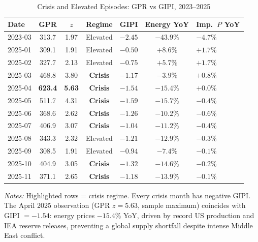 \documentclass[12pt]{article}
\begin{document}
\begin{table}[htbp]\begin{center}
\caption{Crisis and Elevated Episodes: GPR vs GIPI, 2023--2025}
\label{tab:decouple}
\begin{threeparttable}\small
\begin{tabular}{lcccccl}
\toprule
Date & GPR & $z$ & Regime & GIPI & Energy YoY & Imp.\ $P$ YoY\\
\midrule
2023-03 & 313.7 & 1.97 & Elevated & $-2.45$ & $-43.9\%$ & $-4.7\%$\\
2025-01 & 309.1 & 1.91 & Elevated & $-0.50$ & $+8.6\%$ & $+1.7\%$\\
2025-02 & 327.7 & 2.13 & Elevated & $-0.75$ & $+5.7\%$ & $+1.7\%$\\
\rowcolor{yellow!15}
2025-03 & 468.8 & 3.80 & \textbf{Crisis} & $-1.17$ & $-3.9\%$ & $+0.8\%$\\
\rowcolor{yellow!15}
2025-04 & \textbf{623.4} & \textbf{5.63} & \textbf{Crisis} & $-1.54$ & $-15.4\%$ & $+0.0\%$\\
\rowcolor{yellow!15}
2025-05 & 511.7 & 4.31 & \textbf{Crisis} & $-1.59$ & $-15.7\%$ & $-0.4\%$\\
\rowcolor{yellow!15}
2025-06 & 368.6 & 2.62 & \textbf{Crisis} & $-1.26$ & $-10.2\%$ & $-0.6\%$\\
\rowcolor{yellow!15}
2025-07 & 406.9 & 3.07 & \textbf{Crisis} & $-1.04$ & $-11.2\%$ & $-0.4\%$\\
2025-08 & 343.3 & 2.32 & Elevated & $-1.21$ & $-12.9\%$ & $-0.3\%$\\
2025-09 & 308.5 & 1.91 & Elevated & $-0.94$ & $-7.4\%$ & $-0.1\%$\\
\rowcolor{yellow!15}
2025-10 & 404.9 & 3.05 & \textbf{Crisis} & $-1.32$ & $-14.6\%$ & $-0.2\%$\\
\rowcolor{yellow!15}
2025-11 & 371.1 & 2.65 & \textbf{Crisis} & $-1.18$ & $-13.9\%$ & $-0.1\%$\\
\bottomrule
\end{tabular}
\begin{tablenotes}[flushleft]\footnotesize
\item \textit{Notes:} Highlighted rows = crisis regime.
Every crisis month has negative GIPI.
The April 2025 observation (GPR $z = 5.63$, sample maximum) coincides with
GIPI $= -1.54$: energy prices $-15.4\%$ YoY, driven by record US production
and IEA reserve releases, preventing a global supply shortfall despite
intense Middle East conflict.
\end{tablenotes}
\end{threeparttable}
\end{center}\end{table}
\end{document}

